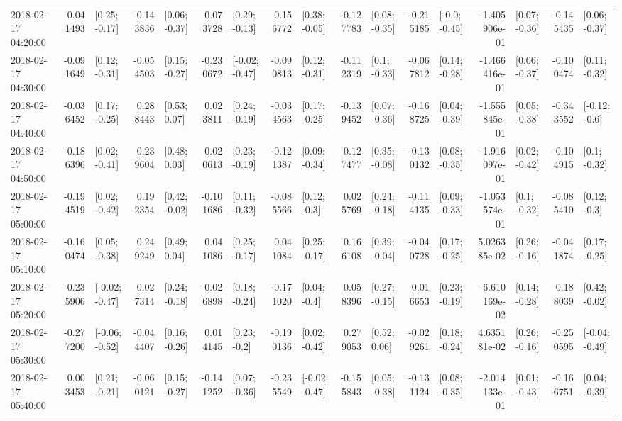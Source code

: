 \begin{tabular}{lrlrlrlrlrlrlrlrl}
2018-02-17 04:20:00 &  0.041493 &   [0.25; -0.17] & -0.143836 &   [0.06; -0.37] &  0.073728 &   [0.29; -0.13] &  0.156772 &   [0.38; -0.05] & -0.127783 &   [0.08; -0.35] & -0.215185 &   [-0.0; -0.45] & -1.405906e-01 &   [0.07; -0.36] & -0.145435 &   [0.06; -0.37] \\
2018-02-17 04:30:00 & -0.091649 &   [0.12; -0.31] & -0.054503 &   [0.15; -0.27] & -0.230672 &  [-0.02; -0.47] & -0.090813 &   [0.12; -0.31] & -0.112319 &    [0.1; -0.33] & -0.067812 &   [0.14; -0.28] & -1.466416e-01 &   [0.06; -0.37] & -0.100474 &   [0.11; -0.32] \\
2018-02-17 04:40:00 & -0.036452 &   [0.17; -0.25] &  0.288443 &    [0.53; 0.07] &  0.023811 &   [0.24; -0.19] & -0.034563 &   [0.17; -0.25] & -0.139452 &   [0.07; -0.36] & -0.168725 &   [0.04; -0.39] & -1.555845e-01 &   [0.05; -0.38] & -0.343552 &   [-0.12; -0.6] \\
2018-02-17 04:50:00 & -0.186396 &   [0.02; -0.41] &  0.239604 &    [0.48; 0.03] &  0.020613 &   [0.23; -0.19] & -0.121387 &   [0.09; -0.34] &  0.127477 &   [0.35; -0.08] & -0.130132 &   [0.08; -0.35] & -1.916097e-01 &   [0.02; -0.42] & -0.104915 &    [0.1; -0.32] \\
2018-02-17 05:00:00 & -0.194519 &   [0.02; -0.42] &  0.192354 &   [0.42; -0.02] & -0.101686 &   [0.11; -0.32] & -0.085566 &    [0.12; -0.3] &  0.025769 &   [0.24; -0.18] & -0.114135 &   [0.09; -0.33] & -1.053574e-01 &    [0.1; -0.32] & -0.085410 &    [0.12; -0.3] \\
2018-02-17 05:10:00 & -0.160474 &   [0.05; -0.38] &  0.249249 &    [0.49; 0.04] &  0.041086 &   [0.25; -0.17] &  0.041084 &   [0.25; -0.17] &  0.166108 &   [0.39; -0.04] & -0.040728 &   [0.17; -0.25] &  5.026385e-02 &   [0.26; -0.16] & -0.041874 &   [0.17; -0.25] \\
2018-02-17 05:20:00 & -0.235906 &  [-0.02; -0.47] &  0.027314 &   [0.24; -0.18] & -0.026898 &   [0.18; -0.24] & -0.171020 &    [0.04; -0.4] &  0.058396 &   [0.27; -0.15] &  0.016653 &   [0.23; -0.19] & -6.610169e-02 &   [0.14; -0.28] &  0.188039 &   [0.42; -0.02] \\
2018-02-17 05:30:00 & -0.277200 &  [-0.06; -0.52] & -0.044407 &   [0.16; -0.26] &  0.014145 &    [0.23; -0.2] & -0.190136 &   [0.02; -0.42] &  0.279053 &    [0.52; 0.06] & -0.029261 &   [0.18; -0.24] &  4.635181e-02 &   [0.26; -0.16] & -0.250595 &  [-0.04; -0.49] \\
2018-02-17 05:40:00 &  0.003453 &   [0.21; -0.21] & -0.060121 &   [0.15; -0.27] & -0.141252 &   [0.07; -0.36] & -0.235549 &  [-0.02; -0.47] & -0.155843 &   [0.05; -0.38] & -0.131124 &   [0.08; -0.35] & -2.014133e-01 &   [0.01; -0.43] & -0.166751 &   [0.04; -0.39] \\

\end{tabular}
